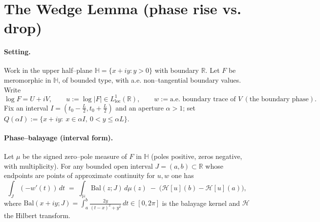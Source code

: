 
\section*{The Wedge Lemma (phase rise vs. drop)}

\paragraph{Setting.}
Work in the upper half–plane $\mathbb{H}=\{x+iy:y>0\}$ with boundary $\mathbb{R}$. Let $F$ be meromorphic in $\mathbb{H}$, of bounded type, with a.e. non–tangential boundary values. Write
\[
\log F=U+iV, \qquad u:=\log|F|\in L^1_{\mathrm{loc}}(\mathbb{R}),\qquad
w:=\text{a.e. boundary trace of }V\ (\text{the boundary phase}).
\]
Fix an interval $I=(t_0-\tfrac{L}{2},t_0+\tfrac{L}{2})$ and an aperture $\alpha>1$;
set $Q(\alpha I):=\{x+iy:\ x\in \alpha I,\ 0<y\le \alpha L\}$.

\paragraph{Phase–balayage (interval form).}
Let $\mu$ be the signed zero–pole measure of $F$ in $\mathbb{H}$ (poles positive, zeros negative, with multiplicity). For any bounded open interval $J=(a,b)\subset \mathbb{R}$ whose endpoints are points of approximate continuity for $u,w$ one has
\begin{equation}\label{eq:PB-interval}
\int_{J} (-w'(t))\,dt
\;=\;\int_{\mathbb{H}}\mathrm{Bal}(z;J)\,d\mu(z)\;-
\;\big(\mathcal{H}[u](b)-\mathcal{H}[u](a)\big),
\end{equation}
where $\mathrm{Bal}(x+iy;J)=\int_{a}^{b}\tfrac{2y}{(t-x)^2+y^2}\,dt\in[0,2\pi]$ is the balayage kernel and $\mathcal{H}$ the Hilbert transform.


